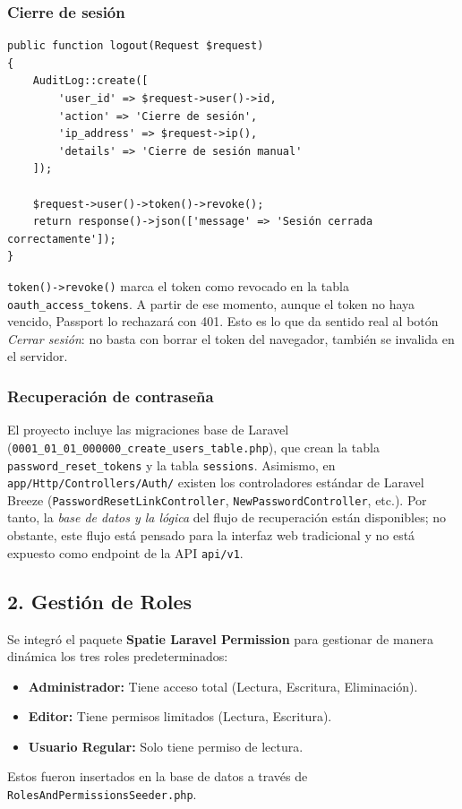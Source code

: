 \subsubsection{Cierre de sesión}
\begin{lstlisting}[caption={AuthController::logout}]
public function logout(Request $request)
{
    AuditLog::create([
        'user_id' => $request->user()->id,
        'action' => 'Cierre de sesión',
        'ip_address' => $request->ip(),
        'details' => 'Cierre de sesión manual'
    ]);

    $request->user()->token()->revoke();
    return response()->json(['message' => 'Sesión cerrada correctamente']);
}
\end{lstlisting}
\texttt{token()->revoke()} marca el token como revocado en la tabla \texttt{oauth\_access\_tokens}. A partir de ese momento, aunque el token no haya vencido, Passport lo rechazará con 401. Esto es lo que da sentido real al botón \emph{Cerrar sesión}: no basta con borrar el token del navegador, también se invalida en el servidor.

\subsubsection{Recuperación de contraseña}
El proyecto incluye las migraciones base de Laravel (\texttt{0001\_01\_01\_000000\_create\_users\_table.php}), que crean la tabla \texttt{password\_reset\_tokens} y la tabla \texttt{sessions}. Asimismo, en \texttt{app/Http/Controllers/Auth/} existen los controladores estándar de Laravel Breeze (\texttt{PasswordResetLinkController}, \texttt{NewPasswordController}, etc.). Por tanto, la \emph{base de datos y la lógica} del flujo de recuperación están disponibles; no obstante, este flujo está pensado para la interfaz web tradicional y no está expuesto como endpoint de la API \texttt{api/v1}.

\subsection{2. Gestión de Roles}
Se integró el paquete \textbf{Spatie Laravel Permission} para gestionar de manera dinámica los tres roles predeterminados:
\begin{itemize}
    \item \textbf{Administrador:} Tiene acceso total (Lectura, Escritura, Eliminación).
    \item \textbf{Editor:} Tiene permisos limitados (Lectura, Escritura).
    \item \textbf{Usuario Regular:} Solo tiene permiso de lectura.
\end{itemize}
Estos fueron insertados en la base de datos a través de \texttt{RolesAndPermissionsSeeder.php}.

